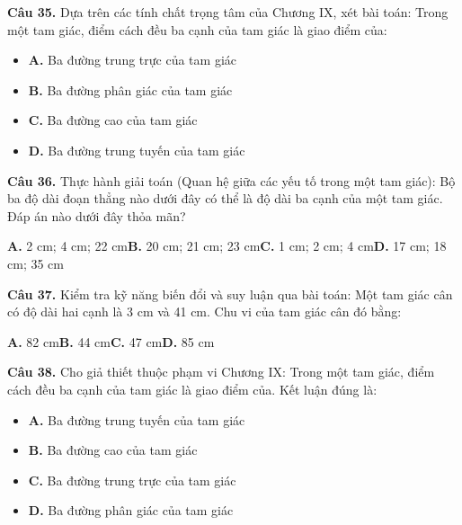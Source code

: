 \documentclass[11pt,a4paper]{article}
\begin{document}
\textbf{\color{primary} Câu 35.} Dựa trên các tính chất trọng tâm của Chương IX, xét bài toán: Trong một tam giác, điểm cách đều ba cạnh của tam giác là giao điểm của:\par
\begin{itemize}\setlength{\itemsep}{1pt}\setlength{\parskip}{0pt}
  \item[] \textbf{A.} Ba đường trung trực của tam giác
  \item[] \textbf{B.} Ba đường phân giác của tam giác
  \item[] \textbf{C.} Ba đường cao của tam giác
  \item[] \textbf{D.} Ba đường trung tuyến của tam giác
\end{itemize}\vspace{2pt}
\textbf{\color{primary} Câu 36.} Thực hành giải toán (Quan hệ giữa các yếu tố trong một tam giác): Bộ ba độ dài đoạn thẳng nào dưới đây có thể là độ dài ba cạnh của một tam giác. Đáp án nào dưới đây thỏa mãn?\par
\hspace*{1.5em}\textbf{A.} 2 cm; 4 cm; 22 cm\quad\quad \textbf{B.} 20 cm; 21 cm; 23 cm\quad\quad \textbf{C.} 1 cm; 2 cm; 4 cm\quad\quad \textbf{D.} 17 cm; 18 cm; 35 cm\par\vspace{2pt}
\textbf{\color{primary} Câu 37.} Kiểm tra kỹ năng biến đổi và suy luận qua bài toán: Một tam giác cân có độ dài hai cạnh là 3 cm và 41 cm. Chu vi của tam giác cân đó bằng:\par
\hspace*{1.5em}\textbf{A.} 82 cm\quad\quad \textbf{B.} 44 cm\quad\quad \textbf{C.} 47 cm\quad\quad \textbf{D.} 85 cm\par\vspace{2pt}
\textbf{\color{primary} Câu 38.} Cho giả thiết thuộc phạm vi Chương IX: Trong một tam giác, điểm cách đều ba cạnh của tam giác là giao điểm của. Kết luận đúng là:\par
\begin{itemize}\setlength{\itemsep}{1pt}\setlength{\parskip}{0pt}
  \item[] \textbf{A.} Ba đường trung tuyến của tam giác
  \item[] \textbf{B.} Ba đường cao của tam giác
  \item[] \textbf{C.} Ba đường trung trực của tam giác
  \item[] \textbf{D.} Ba đường phân giác của tam giác
\end{itemize}\vspace{2pt}
\end{document}
